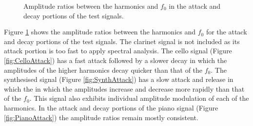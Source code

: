\begin{figure}[h!]
			\caption{Amplitude ratios between the harmonics and $f_{0}$ in the attack and decay
				 portions of the test signals.}
			\label{fig:AttackAmplitudes}
		\end{figure}

		Figure \ref{fig:AttackAmplitudes} shows the amplitude ratios between the harmonics and $f_{0}$ for the
		attack and decay portions of the test signals. The clarinet signal is not included as its attack portion is
		too fast to apply spectral analysis. The cello signal (Figure \ref{fig:CelloAttack}) has a fast attack
		followed by a slower decay in which the amplitudes of the higher harmonics decay quicker than that of the
		$f_{0}$. The synthesised signal (Figure \ref{fig:SynthAttack}) has a slow attack and release in which the
		in which the amplitudes increase and decrease more rapidly than that of the $f_{0}$. This signal also
		exhibits individual amplitude modulation of each of the harmonics. In the attack and decay portions of the
		piano signal (Figure \ref{fig:PianoAttack}) the amplitude ratios remain mostly consistent.

